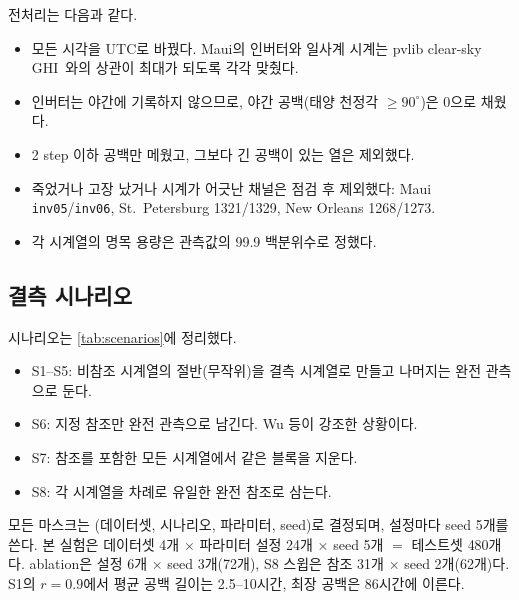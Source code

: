 \documentclass[11pt,a4paper]{article}
\newcommand{\tabdir}{../tables/ko}
\begin{document}
전처리는 다음과 같다.
\begin{itemize}
  \item 모든 시각을 UTC로 바꿨다. Maui의 인버터와 일사계 시계는 pvlib clear-sky GHI~\cite{holmgren2018pvlib,ineichen2002}와의 상관이 최대가 되도록 각각 맞췄다.
  \item 인버터는 야간에 기록하지 않으므로, 야간 공백(태양 천정각 $\ge 90^\circ$)은 0으로 채웠다.
  \item 2 step 이하 공백만 메웠고, 그보다 긴 공백이 있는 열은 제외했다.
  \item 죽었거나 고장 났거나 시계가 어긋난 채널은 점검 후 제외했다: Maui \texttt{inv05}/\texttt{inv06}, St.\ Petersburg 1321/1329, New Orleans 1268/1273.
  \item 각 시계열의 명목 용량은 관측값의 99.9 백분위수로 정했다.
\end{itemize}

\begin{table}[t]
  \centering\small
  \caption{데이터셋. 모든 구간은 야간 보정 후 결측이 없다. ``참조''는 S6과 FPRM-ref에서 쓰는 지정 참조다.}
  \label{tab:datasets}
  \resizebox{\linewidth}{!}{}
\end{table}

\subsection{결측 시나리오}

시나리오는 \cref{tab:scenarios}에 정리했다.
\begin{itemize}
  \item S1--S5: 비참조 시계열의 절반(무작위)을 결측 시계열로 만들고 나머지는 완전 관측으로 둔다.
  \item S6: 지정 참조만 완전 관측으로 남긴다. Wu 등이 강조한 상황이다.
  \item S7: 참조를 포함한 모든 시계열에서 같은 블록을 지운다.
  \item S8: 각 시계열을 차례로 유일한 완전 참조로 삼는다.
\end{itemize}
모든 마스크는 (데이터셋, 시나리오, 파라미터, seed)로 결정되며, 설정마다 seed 5개를 쓴다.
본 실험은 데이터셋 4개 $\times$ 파라미터 설정 24개 $\times$ seed 5개 $=$ 테스트셋 480개다.
ablation은 설정 6개 $\times$ seed 3개(72개), S8 스윕은 참조 31개 $\times$ seed 2개(62개)다.
S1의 $r=0.9$에서 평균 공백 길이는 2.5--10시간, 최장 공백은 86시간에 이른다.

\begin{table}[t]
  \centering\small
  \caption{결측 시나리오. MCAR: 완전 무작위 결측, MNAR: 비무작위 결측.}
  \label{tab:scenarios}
  \resizebox{\linewidth}{!}{}
\end{table}
\end{document}
